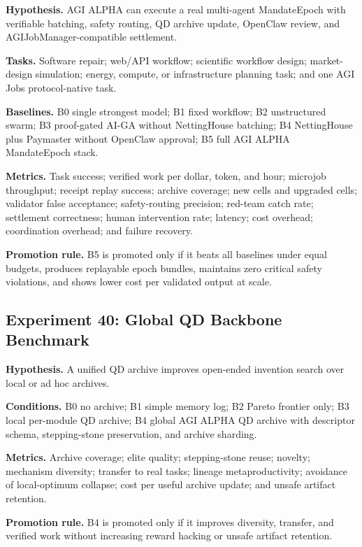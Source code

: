 \textbf{Hypothesis.} AGI ALPHA can execute a real multi-agent
MandateEpoch with verifiable batching, safety routing, QD archive
update, OpenClaw review, and AGIJobManager-compatible settlement.

\textbf{Tasks.} Software repair; web/API workflow; scientific workflow
design; market-design simulation; energy, compute, or infrastructure
planning task; and one AGI Jobs protocol-native task.

\textbf{Baselines.} B0 single strongest model; B1 fixed workflow; B2
unstructured swarm; B3 proof-gated AI-GA without NettingHouse batching;
B4 NettingHouse plus Paymaster without OpenClaw approval; B5 full AGI
ALPHA MandateEpoch stack.

\textbf{Metrics.} Task success; verified work per dollar, token, and
hour; microjob throughput; receipt replay success; archive coverage; new
cells and upgraded cells; validator false acceptance; safety-routing
precision; red-team catch rate; settlement correctness; human
intervention rate; latency; cost overhead; coordination overhead; and
failure recovery.

\textbf{Promotion rule.} B5 is promoted only if it beats all baselines
under equal budgets, produces replayable epoch bundles, maintains zero
critical safety violations, and shows lower cost per validated output at
scale.

\subsection{Experiment 40: Global QD Backbone
Benchmark}\label{experiment-40-global-qd-backbone-benchmark}

\textbf{Hypothesis.} A unified QD archive improves open-ended invention
search over local or ad hoc archives.

\textbf{Conditions.} B0 no archive; B1 simple memory log; B2 Pareto
frontier only; B3 local per-module QD archive; B4 global AGI ALPHA QD
archive with descriptor schema, stepping-stone preservation, and archive
sharding.

\textbf{Metrics.} Archive coverage; elite quality; stepping-stone reuse;
novelty; mechanism diversity; transfer to real tasks; lineage
metaproductivity; avoidance of local-optimum collapse; cost per useful
archive update; and unsafe artifact retention.

\textbf{Promotion rule.} B4 is promoted only if it improves diversity,
transfer, and verified work without increasing reward hacking or unsafe
artifact retention.

